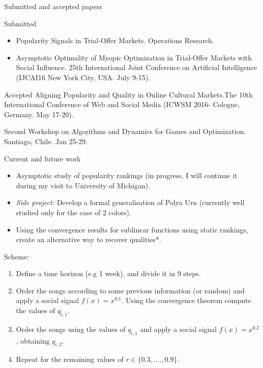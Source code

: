 \begin{frame}[c]{Submitted and accepted papers}

\begin{block}{Submitted}
\begin{itemize}
\item Popularity Signals in Trial-Offer Markets. Operations Research.
\item Asymptotic Optimality of Myopic Optimization in Trial-Offer Markets with Social Influence. 25th International Joint Conference on Artificial Intelligence (IJCAI16 New York City, USA. July 9-15). 
\end{itemize}
\end{block}

\begin{block}{Accepted}
 Aligning Popularity and Quality in Online Cultural Markets.The 10th International Conference of Web and Social Media (ICWSM 2016- Cologne, Germany. May 17-20).
\end{block}

\begin{block}
{Second Workshop on Algorithms and Dynamics for Games and Optimization. Santiago, Chile. Jan 25-29.}
\end{block}



\end{frame}




\begin{frame}[c]{Current and future work}
\begin{itemize}
\item Asymptotic study of popularity rankings (in progress, I will continue it during my visit to University of Michigan).
\item {\it Side project:} Develop a formal generalisation of Polya Urn (currently well studied only for the case of 2 colors).
\item Using the convergence results for sublinear functions using static rankings, create an alternative way to recover qualities*.
\end{itemize}

\begin{alertblock}{Scheme:}
\begin{enumerate}
\item Define a time horizon (e.g 1 week), and divide it in 9 steps.
\item Order the songs according to some previous information (or random) and apply a social signal $f(x)=x^{0.1}$.  Using the convergence theorem compute the values of $q_{i,1}$.
\item Order the songs using the values of $q_{i,1}$ and apply a social signal $f(x)=x^{0.2}$, obtaining $q_{i,2}$.
\item Repeat for the remaining values of $r \in \{0.3,...., 0.9\}$.
\end{enumerate}
\end{alertblock}


\end{frame}


